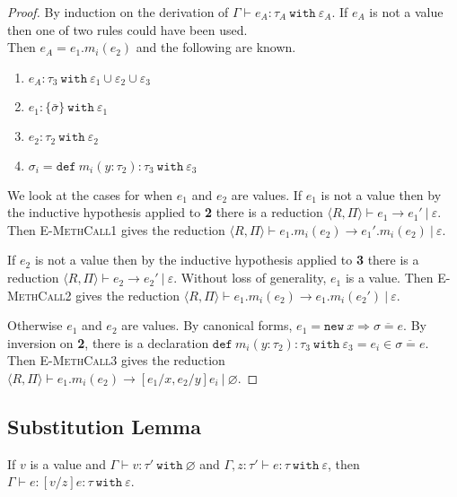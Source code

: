 \documentclass[a4paper,UKenglish]{lipics-v2016}
\newcommand{\kw}[1]{\mathtt{ #1 }~}
\newcommand{\kwa}[1]{\mathtt{ #1 }}
\newcommand{\newbasic}[0]{
	\kwa{new}~x \Rightarrow \overline{\sigma = e}
}
\newcommand{\rctx}[0]{ \langle R, \Pi \rangle }
\begin{document}
\begin{proof}

By induction on the derivation of $\Gamma \vdash e_A: \tau_A~\kw{with} \varepsilon_A$. If $e_A$ is not a value then one of two rules could have been used.\\

\noindent
{} Then $e_A = e_1.m_i(e_2)$ and the following are known.

\begin{enumerate}
	\item $e_A: \tau_3~\kw{with} \varepsilon_1 \cup \varepsilon_2 \cup \varepsilon_3$
	\item $e_1: \{ \bar \sigma \}~\kw{with} \varepsilon_1$
	\item $e_2: \tau_2~\kw{with} \varepsilon_2$
	\item $\sigma_i = \kwa{def}~m_i(y: \tau_2): \tau_3~\kw{with} \varepsilon_3$
\end{enumerate}

\noindent
We look at the cases for when $e_1$ and $e_2$ are values. If $e_1$ is not a value then by the inductive hypothesis applied to \textbf{2} there is a reduction $\rctx \vdash e_1 \longrightarrow e_1'~|~\varepsilon$. Then \textsc{E-MethCall1} gives the reduction $\rctx \vdash e_1.m_i(e_2) \longrightarrow e_1'.m_i(e_2)~|~\varepsilon$.

If $e_2$ is not a value then by the inductive hypothesis applied to \textbf{3} there is a reduction $\rctx \vdash e_2 \longrightarrow e_2'~|~\varepsilon$. Without loss of generality, $e_1$ is a value. Then \textsc{E-MethCall2} gives the reduction $\rctx \vdash e_1.m_i(e_2) \longrightarrow e_1.m_i(e_2')~|~\varepsilon$.

Otherwise $e_1$ and $e_2$ are values. By canonical forms, $e_1 = \newbasic$. By inversion on \textbf{2}, there is a declaration $\kwa{def}~m_i(y: \tau_2): \tau_3~\kw{with} \varepsilon_3 = e_i \in \overline{\sigma = e}$. Then \textsc{E-MethCall3} gives the reduction $\rctx \vdash e_1.m_i(e_2) \longrightarrow [e_1/x, e_2/y]e_i~|~\varnothing$.

\end{proof}

\subsection{Substitution Lemma}

\begin{lemma}
If $v$ is a value and $\Gamma \vdash v: \tau'~\kw{with} \varnothing$ and $\Gamma, z: \tau' \vdash e: \tau~\kw{with} \varepsilon$, then $\Gamma \vdash e: [v/z]e: \tau~\kw{with} \varepsilon$.
\end{lemma}
\end{document}
